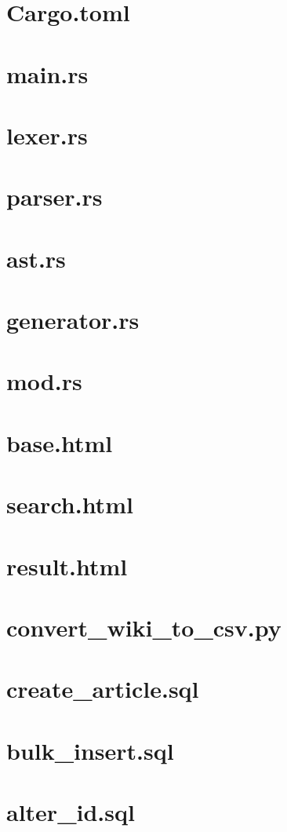 \section{Cargo.toml}

\section{main.rs}

\section{lexer.rs}

\section{parser.rs}

\section{ast.rs}

\section{generator.rs}

\section{mod.rs}

\section{base.html}

\section{search.html}

\section{result.html}

\section{convert\_wiki\_to\_csv.py}

\section{create\_article.sql}

\section{bulk\_insert.sql}

\section{alter\_id.sql}
